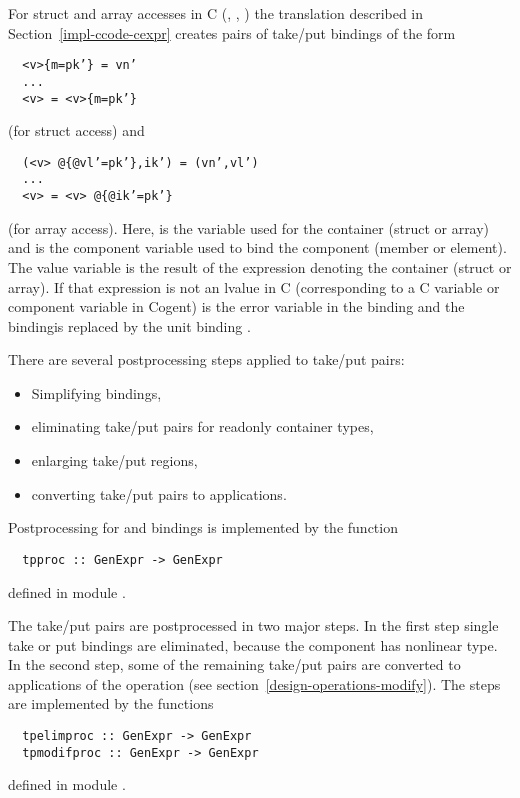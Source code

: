 For struct and array accesses in C (, , ) the translation described in Section~\ref{impl-ccode-cexpr}
creates pairs of take/put bindings of the form
\begin{verbatim}
  <v>{m=pk’} = vn’
  ...
  <v> = <v>{m=pk’}
\end{verbatim}
(for struct access) and
\begin{verbatim}
  (<v> @{@vl’=pk’},ik’) = (vn’,vl’)
  ...
  <v> = <v> @{@ik’=pk’}
\end{verbatim}
(for array access). Here,  is the variable used for the container (struct or array) and  is the component variable 
used to bind the component (member or element). The value variable  is the result of the expression denoting the container
(struct or array). If that expression is not an lvalue in C (corresponding to a C variable or component variable in Cogent) 
is the error variable  in the  binding and the  bindingis replaced by the unit binding \code{() = ()}.

There are several postprocessing steps applied to take/put pairs:
\begin{itemize}
\item Simplifying  bindings,
\item eliminating take/put pairs for readonly container types,
\item enlarging take/put regions,
\item converting take/put pairs to  applications.
\end{itemize}


Postprocessing for  and  bindings is implemented by the function
\begin{verbatim}
  tpproc :: GenExpr -> GenExpr
\end{verbatim}
defined in module .

The take/put pairs are postprocessed in two major steps. In the first step single take or put bindings are eliminated, because the component
has nonlinear type. In the second step, some of the remaining take/put pairs are converted to applications of the  operation
(see section~\ref{design-operations-modify}). The steps are implemented by the functions
\begin{verbatim}
  tpelimproc :: GenExpr -> GenExpr
  tpmodifproc :: GenExpr -> GenExpr
\end{verbatim}
defined in module .

